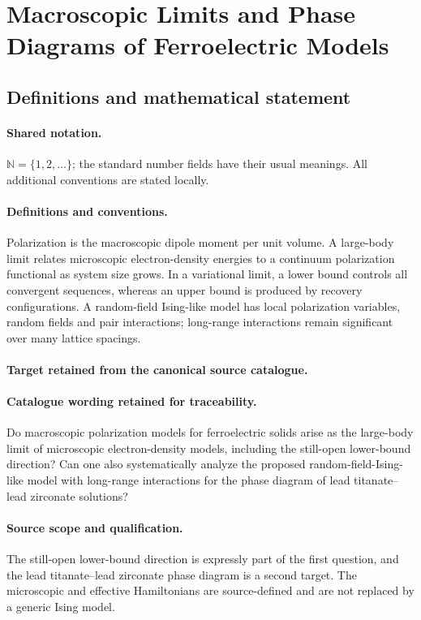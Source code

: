 \documentclass[11pt]{article}
\begin{document}
\section{Macroscopic Limits and Phase Diagrams of Ferroelectric Models}\label{statement}

\subsection{Definitions and mathematical statement}

\paragraph{Shared notation.}$\mathbb N=\{1,2,\ldots\}$; the standard number fields have their usual meanings. All additional conventions are stated locally.


\paragraph{Definitions and conventions.}
Polarization is the macroscopic dipole moment per unit volume. A large-body limit relates microscopic electron-density energies to a continuum polarization functional as system size grows. In a variational limit, a lower bound controls all convergent sequences, whereas an upper bound is produced by recovery configurations. A random-field Ising-like model has local polarization variables, random fields and pair interactions; long-range interactions remain significant over many lattice spacings.

\paragraph{Target retained from the canonical source catalogue.}
\paragraph{Catalogue wording retained for traceability.}
Do macroscopic polarization models for ferroelectric solids arise as the large-body limit of microscopic electron-density models, including the still-open lower-bound direction? Can one also systematically analyze the proposed random-field-Ising-like model with long-range interactions for the phase diagram of lead titanate–lead zirconate solutions?

\paragraph{Source scope and qualification.}
The still-open lower-bound direction is expressly part of the first question, and the lead titanate--lead zirconate phase diagram is a second target. The microscopic and effective Hamiltonians are source-defined and are not replaced by a generic Ising model.
\end{document}
